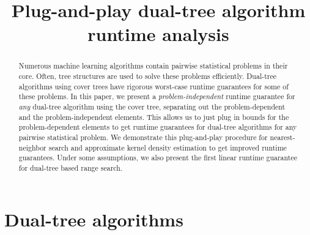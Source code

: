 \documentclass{article} %
\title{Plug-and-play dual-tree algorithm runtime analysis}
\begin{document}
\maketitle

\vspace*{-0.8em}
\begin{abstract}
Numerous machine learning algorithms contain pairwise statistical
problems in their core. Often, tree structures are used
to solve these problems efficiently. Dual-tree
algorithms using cover trees have
rigorous worst-case runtime guarantees for some of these problems. In this paper, we present a {\em
problem-independent} runtime guarantee for {\em any} dual-tree
algorithm using the cover tree, separating out the problem-dependent and
the problem-independent elements. This allows us to just plug in
bounds for the problem-dependent elements to get runtime guarantees
for dual-tree algorithms for any pairwise statistical problem. We
demonstrate this plug-and-play procedure for nearest-neighbor search
and approximate kernel density estimation to get improved runtime
guarantees.  Under some assumptions, we also present the first linear runtime
guarantee for dual-tree based range search.
\end{abstract}

\vspace*{-1em}

\section{Dual-tree algorithms}
\vspace*{-0.5em}
\end{document}
